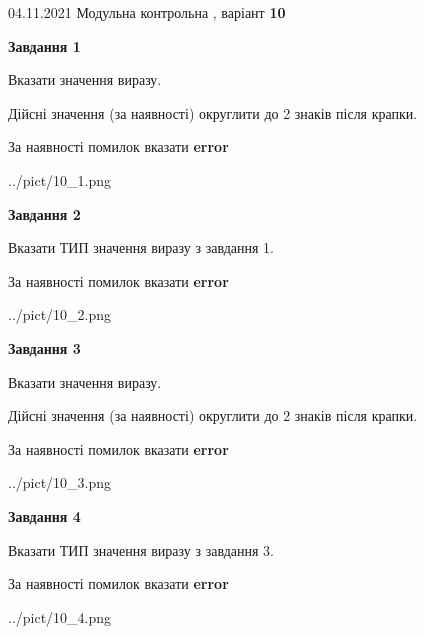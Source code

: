 \documentclass[11pt, ukrainian]{article}
\begin{document}
{04.11.2021 Модульна контрольна , варіант  \No \textbf { 10 }\par}
{
\begin {large}
{\begin {center}\textbf{Завдання 1}\end {center}}\par
Вказати значення виразу. \par
Дійсні значення (за наявності) округлити до 2 знаків після крапки. \par
За наявності помилок вказати \textbf{error}

\begin{center}
	{../pict/10_1.png}
\end{center}
\newpage

{\begin {center}\textbf{Завдання 2}\end {center}}\par
Вказати ТИП значення виразу з завдання 1. \par
За наявності помилок вказати \textbf{error}

\begin{center}
	{../pict/10_2.png}
\end{center}
\newpage

{\begin {center}\textbf{Завдання 3}\end {center}}\par
Вказати значення виразу. \par
Дійсні значення (за наявності) округлити до 2 знаків після крапки. \par
За наявності помилок вказати \textbf{error}

\begin{center}
	{../pict/10_3.png}
\end{center}
\newpage

{\begin {center}\textbf{Завдання 4}\end {center}}\par
Вказати ТИП значення виразу з завдання 3. \par
За наявності помилок вказати \textbf{error}

\begin{center}
	{../pict/10_4.png}
\end{center}
\newpage


\end{large}}
\end{document}
